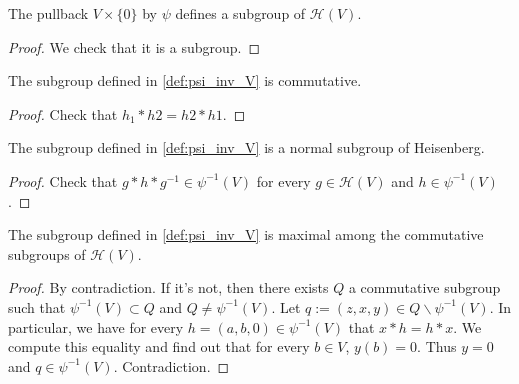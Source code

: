 \begin{definition}[$\psi^{-1}(V)$]
    \label{def:psi_inv_V}
    \leanok 

    The pullback $V\times\{0\}$ by $\psi$ defines a subgroup of $\mathcal{H}(V)$.
    \begin{proof}
        \leanok
        We check that it is a subgroup.
    \end{proof}
\end{definition}

\begin{proposition}
    \label{prop:psi_inv_V_comm}
    \leanok

    The subgroup defined in \ref{def:psi_inv_V} is commutative.
\end{proposition}
\begin{proof}
    \leanok
    Check that $h_1*h2=h2*h1$.
\end{proof}

\begin{proposition}
    \label{prop:psi_inv_V_normal}
    \leanok

    The subgroup defined in \ref{def:psi_inv_V} is a normal subgroup of Heisenberg.
\end{proposition}
\begin{proof}
    \leanok 
    Check that $g*h*g^{-1}\in \psi^{-1}(V)$ for every $g\in \mathcal{H}(V)$ and $h\in \psi^{-1}(V)$.
\end{proof}

\begin{proposition}
    \label{prop:psi_inv_V_max}
    \leanok

    The subgroup defined in \ref{def:psi_inv_V} is maximal among the
    commutative subgroups of $\mathcal{H}(V)$.
\end{proposition}
\begin{proof}
    \leanok 
    By contradiction. If it's not, then there exists $Q$ a commutative subgroup
    such that $\psi^{-1}(V)\subset Q$ and $Q\ne \psi^{-1}(V)$. Let $q:=(z,x,y)\in Q\backslash \psi^{-1}(V)$.
    In particular, we have for every $h=(a,b,0)\in \psi^{-1}(V)$ that $x*h=h*x$.
    We compute this equality and find out that for every $b\in V$, $y(b)=0$. Thus $y=0$ and $q\in \psi^{-1}(V)$.
    Contradiction.
\end{proof}

